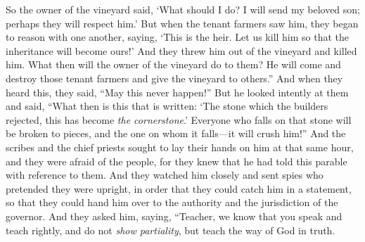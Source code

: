 \begin{biblechapter}
\verse So the owner of the vineyard said, ‘What should I do? I will send my beloved son; perhaps they will respect him.’
\verse But when the tenant farmers saw him, they began to reason with one another, saying, ‘This is the heir. Let us kill him so that the inheritance will become ours!’
\verse And they threw him out of the vineyard and killed him. What then will the owner of the vineyard do to them?
\verse He will come and destroy those tenant farmers and give the vineyard to others.” And when they heard this, they said, “May this never happen!”
\verse But he looked intently at them and said, “What then is this that is written: ‘The stone which the builders rejected, 
this has become \textit{the cornerstone}.’
\verse Everyone who falls on that stone will be broken to pieces, and the one on whom it falls—it will crush him!”
\verse And the scribes and the chief priests sought to lay their hands on him at that same hour, and they were afraid of the people, for they knew that he had told this parable with reference to them.
 And they watched him closely and sent spies who pretended they were upright, in order that they could catch him in a statement, so that they could hand him over to the authority and the jurisdiction of the governor.
\verse And they asked him, saying, “Teacher, we know that you speak and teach rightly, and do not \textit{show partiality}, but teach the way of God in truth.

\end{biblechapter}
